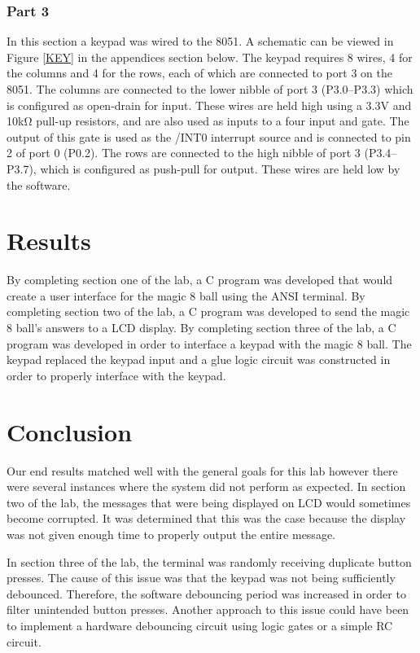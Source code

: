 \documentclass[12pt]{article}
\begin{document}
\subsubsection{Part 3}
In this section a keypad was wired to the 8051. A schematic can be viewed in Figure \ref{KEY} in the appendices section below. The keypad requires 8 wires, 4 for the columns and 4 for the rows, each of which are connected to port 3 on the 8051. The columns are connected to the lower nibble of port 3 (P3.0--P3.3) which is configured as open-drain for input. These wires are held high using a 3.3\si{V} and 10k\si{\ohm} pull-up resistors, and are also used as inputs to a four input and gate. The output of this gate is used as the /INT0 interrupt source and is connected to pin 2 of port 0 (P0.2). The rows are connected to the high nibble of port 3 (P3.4--P3.7), which is configured as push-pull for output. These wires are held low by the software. 

\section{Results}
By completing section one of the lab, a C program was developed that would create a user interface for the magic 8 ball using the ANSI terminal. By completing section two of the lab, a C program was developed to send the magic 8 ball's answers to a LCD display. By completing section three of the lab, a C program was developed in order to interface a keypad with the magic 8 ball. The keypad replaced the keypad input and a glue logic circuit was constructed in order to properly interface with the keypad. 	


\section{Conclusion}
Our end results matched well with the general goals for this lab however there were several instances where the system did not perform as expected. In section two of the lab, the messages that were being displayed on LCD would sometimes become corrupted. It was determined that this was the case because the display was not given enough time to properly output the entire message. 

In section three of the lab, the terminal was randomly receiving duplicate button presses. The cause of this issue was that the keypad was not being sufficiently debounced. Therefore, the software debouncing period was increased in order to filter unintended button presses. Another approach to this issue could have been to implement a hardware debouncing circuit using logic gates or a simple RC circuit. 
 
\end{document}
